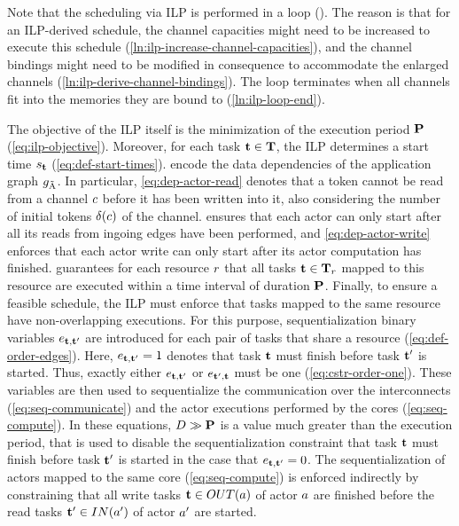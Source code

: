 Note that the scheduling via \ac{ILP} is performed in a loop ().
The reason is that for an \ac{ILP}-derived schedule, the channel capacities might need to be increased to execute this schedule (\cref{ln:ilp-increase-channel-capacities}), and the channel bindings might need to be modified in consequence to accommodate the enlarged channels (\cref{ln:ilp-derive-channel-bindings}).
The loop terminates when all channels fit into the memories they are bound to (\cref{ln:ilp-loop-end}).
\par
The objective of the \ac{ILP} itself is the minimization of the execution period $\mathbf{P}$ (\cref{eq:ilp-objective}).
Moreover, for each task $\mathbf{t} \in \mathbf{T}$, the \ac{ILP} determines a start time $s_{\mathbf{t}}$ (\cref{eq:def-start-times}).
 encode the data dependencies of the application graph $g_{\tilde{\textrm{A}}}$.
In particular, \cref{eq:dep-actor-read} denotes that a token cannot be read from a channel $c$ before it has been written into it, also considering the number of initial tokens $\delta(c)$ of the channel.
 ensures that each actor can only start after all its reads from ingoing edges have been performed, and \cref{eq:dep-actor-write} enforces that each actor write can only start after its actor computation has finished.
 guarantees for each resource $r$ that all tasks $\mathbf{t} \in \mathbf{T}_r$ mapped to this resource are executed within a time interval of duration $\mathbf{P}$.
Finally, to ensure a feasible schedule, the \ac{ILP} must enforce that tasks mapped to the same resource have non-overlapping executions.
For this purpose, sequentialization binary variables $e_{\mathbf{t},\mathbf{t}'}$ are introduced for each pair of tasks that share a resource (\cref{eq:def-order-edges}).
Here, $e_{\mathbf{t},\mathbf{t}'} = 1$ denotes that task $\mathbf{t}$ must finish before task $\mathbf{t}'$ is started.
Thus, exactly either $e_{\mathbf{t},\mathbf{t}'}$ or $e_{\mathbf{t}',\mathbf{t}}$ must be one (\cref{eq:cstr-order-one}).
These variables are then used to sequentialize the communication over the interconnects (\cref{eq:seq-communicate}) and the actor executions performed by the cores (\cref{eq:seq-compute}).
In these equations, $D \gg \mathbf{P}$ is a value much greater than the execution period, that is used to disable the sequentialization constraint that task $\mathbf{t}$ must finish before task $\mathbf{t}'$ is started in the case that $e_{\mathbf{t},\mathbf{t}'} = 0$.
The sequentialization of actors mapped to the same core (\cref{eq:seq-compute}) is enforced indirectly by constraining that all write tasks $\mathbf{t} \in OUT(a)$ of actor $a$ are finished before the read tasks $\mathbf{t}' \in IN(a')$ of actor $a'$ are started.
